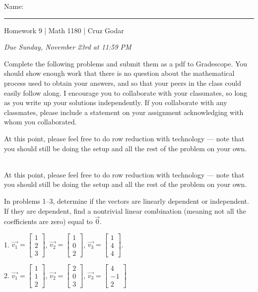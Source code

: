 \documentclass{article}
\begin{document}
\Large Name: \rule{2in}{0.15mm} \hfill Homework 9 | Math 1180 | Cruz Godar \vspace{4pt}  \normalsize

\textit{Due Sunday, November 23rd at 11:59 PM}

Complete the following problems and submit them as a pdf to Gradescope. You should show enough work that there is no question about the mathematical process used to obtain your answers, and so that your peers in the class could easily follow along. I encourage you to collaborate with your classmates, so long as you write up your solutions independently. If you collaborate with any classmates, please include a statement on your assignment acknowledging with whom you collaborated.

At this point, please feel free to do row reduction with technology --- note that you should still be doing the setup and all the rest of the problem on your own.

~\\

At this point, please feel free to do row reduction with technology --- note that you should still be doing the setup and all the rest of the problem on your own.

In problems 1--3, determine if the vectors are linearly dependent or independent. If they are dependent, find a nontrivial linear combination (meaning not all the coefficients are zero) equal to $\vec{0}$.

1. $\vec{v_1} = \left[\begin{array}{c} 1 \\ 2 \\ 3 \end{array}\right]$, $\vec{v_2} = \left[\begin{array}{c} 1 \\ 0 \\ 2 \end{array}\right]$, $\vec{v_3} = \left[\begin{array}{c} 1 \\ 4 \\ 4 \end{array}\right]$.

2. $\vec{v_1} = \left[\begin{array}{c} 1 \\ 1 \\ 2 \end{array}\right]$, $\vec{v_2} = \left[\begin{array}{c} 2 \\ 0 \\ 3 \end{array}\right]$, $\vec{v_3} = \left[\begin{array}{c} 4 \\ - 1 \\ 2 \end{array}\right]$
\end{document}
